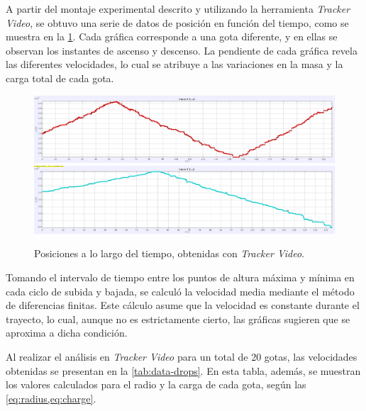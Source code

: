 A partir del montaje experimental descrito y utilizando la herramienta
\emph{Tracker Video}, se obtuvo una serie de datos de posición en función del
tiempo, como se
muestra en la \cref{fig:position}.
Cada gráfica corresponde a una gota diferente, y en ellas se observan los
instantes de ascenso y descenso.
La pendiente de cada gráfica revela las diferentes velocidades, lo cual se
atribuye a las variaciones en la masa y la carga total de cada gota.

\begin{figure}[t]
	\centering
	\includegraphics[width=0.8\linewidth]{./images/positon-drop-tracker-00.png}
	\includegraphics[width=0.8\linewidth]{./images/positon-drop-tracker-01.png}
	\caption{Posiciones a lo largo del tiempo, obtenidas con \emph{Tracker Video}.}
	\label{fig:position}
\end{figure}

Tomando el intervalo de tiempo entre los puntos de altura máxima y mínima en
cada ciclo de subida y bajada, se calculó la velocidad media mediante el método
de diferencias finitas.
Este cálculo asume que la velocidad es constante durante el trayecto, lo cual,
aunque no es estrictamente cierto, las gráficas sugieren que se aproxima a
dicha condición.

Al realizar el análisis en \emph{Tracker Video} para un total de 20 gotas,
las velocidades obtenidas se presentan en la \cref{tab:data-drops}.
En esta tabla, además, se muestran los valores calculados para el radio y la
carga de cada gota, según las \cref{eq:radius,eq:charge}.

